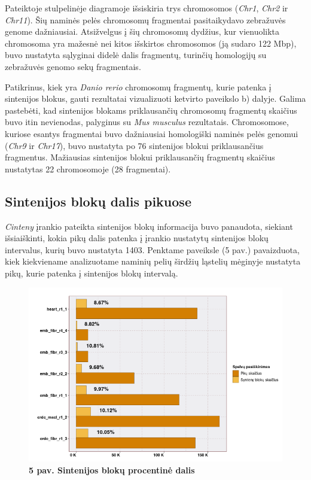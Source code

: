 \documentclass[12pt]{article}
\begin{document}
Pateiktoje stulpelinėje diagramoje išsiskiria trys chromosomos (\emph{Chr1},
\emph{Chr2} ir \emph{Chr11}). Šių naminės pelės chromosomų fragmentai
pasitaikydavo zebražuvės genome dažniausiai. Atsižvelgus į šių chromosomų
dydžius, kur vienuolikta chromosoma yra mažesnė nei kitos išskirtos chromosomos
(ją sudaro 122 Mbp\cite{MGI}), buvo nustatyta sąlyginai didelė dalis fragmentų,
turinčių homologijų su zebražuvės genomo sekų fragmentais.

Patikrinus, kiek yra \emph{Danio rerio} chromosomų fragmentų, kurie patenka į
sintenijos blokus, gauti rezultatai vizualizuoti ketvirto paveikslo b) dalyje.
Galima pastebėti, kad sintenijos blokams priklausančių chromosomų fragmentų
skaičius buvo itin nevienodas, palyginus su \emph{Mus musculus} rezultatais.
Chromosomose, kuriose esantys fragmentai buvo dažniausiai homologiški naminės
pelės genomui (\emph{Chr9} ir \emph{Chr17}), buvo nustatyta po 76 sintenijos
blokui priklausančius fragmentus. Mažiausias sintenijos blokui priklausančių
fragmentų skaičius nustatytas 22 chromosomoje (28 fragmentai).

\newpage

\subsection{Sintenijos blokų dalis pikuose}
\emph{Cinteny} įrankio pateikta sintenijos blokų informacija buvo panaudota,
siekiant išsiaiškinti, kokia pikų dalis patenka į įrankio nustatytų sintenijos
blokų intervalus, kurių buvo nustatyta 1403. Penktame paveiksle (5 pav.)
pavaizduota, kiek kiekviename analizuotame naminių pelių širdžių ląstelių
mėginyje nustatyta pikų, kurie patenka į sintenijos blokų intervalą.

\begin{figure}[htb]
    \begin{center}
        \includegraphics[width=0.8\linewidth]{../Figures/Synteny_blocks_peaks.png}
        \vspace{-2\baselineskip}
        \caption*{\small\textbf{5 pav. Sintenijos blokų procentinė dalis}}
        \label{fig:birds}
    \end{center}
\end{figure}
\end{document}
